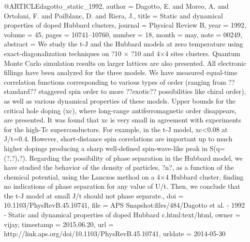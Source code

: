 @ARTICLE{dagotto_static_1992,
  author = {Dagotto, E. and Moreo, A. and Ortolani, F. and Poilblanc, D. and
	Riera, J.},
  title = {Static and dynamical properties of doped {Hubbard} clusters},
  journal = {Physical Review B},
  year = {1992},
  volume = {45},
  pages = {10741--10760},
  number = {18},
  month = may,
  note = {00249},
  abstract = {We study the t-J and the Hubbard models at zero temperature using
	exact-diagonalization techniques on ?10 × ?10 and 4×4 sites clusters.
	Quantum Monte Carlo simulation results on larger lattices are also
	presented. All electronic fillings have been analyzed for the three
	models. We have measured equal-time correlation functions corresponding
	to various types of order (ranging from ??standard?? staggered spin
	order to more ??exotic?? possibilities like chiral order), as well
	as various dynamical properties of these models. Upper bounds for
	the critical hole doping (xc), where long-range antiferromagnetic
	order disappears, are presented. It was found that xc is very small
	in agreement with experiments for the high-Tc superconductors. For
	example, in the t-J model, xc{\textless}0.08 at J/t=0.4. However,
	short-distance spin correlations are important up to much higher
	dopings producing a sharp well-defined spin-wave-like peak in S(q=(?,?),?).
	Regarding the possibility of phase separation in the Hubbard model,
	we have studied the behavior of the density of particles, ?n?, as
	a function of the chemical potential, using the Lanczos method on
	a 4×4 Hubbard cluster, finding no indications of phase separation
	for any value of U/t. Then, we conclude that the t-J model at small
	J/t should not phase separate.},
  doi = {10.1103/PhysRevB.45.10741},
  file = {APS Snapshot:files/484/Dagotto et al. - 1992 - Static and dynamical properties of doped Hubbard c.html:text/html},
  owner = {vijay},
  timestamp = {2015.06.20},
  url = {http://link.aps.org/doi/10.1103/PhysRevB.45.10741},
  urldate = {2014-05-30}
}

